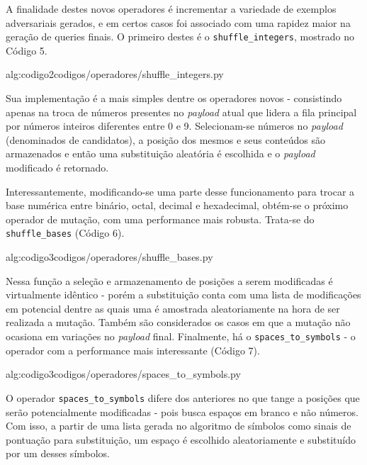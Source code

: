 A finalidade destes novos operadores é incrementar a variedade de exemplos adversariais gerados, e em certos casos foi associado com uma rapidez maior na geração de queries finais. O primeiro destes é o \verb+shuffle_integers+, mostrado no Código 5.

\label{sec:codigos}
 {alg:codigo2}{codigos/operadores/shuffle_integers.py}

\bigskip

Sua implementação é a mais simples dentre os operadores novos - consistindo apenas na troca de números presentes no \textit{payload} atual que lidera a fila principal por números inteiros diferentes entre 0 e 9. Selecionam-se números no \textit{payload} (denominados de candidatos), a posição dos mesmos e seus conteúdos são armazenados e então uma substituição aleatória é escolhida e o \textit{payload} modificado é retornado.  

Interessantemente, modificando-se uma parte desse funcionamento para trocar a base numérica entre binário, octal, decimal e hexadecimal, obtém-se o próximo operador de mutação, com uma performance mais robusta. Trata-se do \verb+shuffle_bases+ (Código 6).

\label{sec:codigos}
 {alg:codigo3}{codigos/operadores/shuffle_bases.py}

\bigskip

Nessa função a seleção e armazenamento de posições a serem modificadas é virtualmente idêntico - porém a substituição conta com uma lista de modificações em potencial dentre as quais uma é amostrada aleatoriamente na hora de ser realizada a mutação. Também são considerados os casos em que a mutação não ocasiona em variações no \textit{payload} final. Finalmente, há o \verb+spaces_to_symbols+ - o operador com a performance mais interessante (Código 7).

\label{sec:codigos}
 {alg:codigo3}{codigos/operadores/spaces_to_symbols.py}

O operador \verb+spaces_to_symbols+ difere dos anteriores no que tange a posições que serão potencialmente modificadas - pois busca espaços em branco e não números. Com isso, a partir de uma lista gerada no algoritmo de símbolos como sinais de pontuação para substituição, um espaço é escolhido aleatoriamente e substituído por um desses símbolos.

\bigskip

